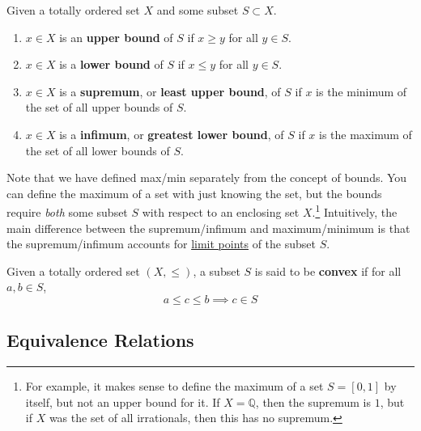   \begin{definition}[Bounds]
    \label{def:bounds}
    Given a totally ordered set $X$ and some subset $S \subset X$. 
    \begin{enumerate}
      \item $x \in X$ is an \textbf{upper bound} of $S$ if $x \geq y$ for all $y \in S$. 
      \item $x \in X$ is a \textbf{lower bound} of $S$ if $x \leq y$ for all $y \in S$. 
      \item $x \in X$ is a \textbf{supremum}, or \textbf{least upper bound}, of $S$ if $x$ is the minimum of the set of all upper bounds of $S$. 
      \item $x \in X$ is a \textbf{infimum}, or \textbf{greatest lower bound}, of $S$ if $x$ is the maximum of the set of all lower bounds of $S$. 
    \end{enumerate}
  \end{definition}

  Note that we have defined max/min separately from the concept of bounds. You can define the maximum of a set with just knowing the set, but the bounds require \textit{both} some subset $S$ with respect to an enclosing set $X$.\footnote{For example, it makes sense to define the maximum of a set $S = [0, 1]$ by itself, but not an upper bound for it. If $X = \mathbb{Q}$, then the supremum is $1$, but if $X$ was the set of all irrationals, then this has no supremum.} Intuitively, the main difference between the supremum/infimum and maximum/minimum is that the supremum/infimum accounts for \hyperref[pst-def:limit-point]{limit points} of the subset $S$. 

  \begin{definition}
    \label{def:convexity-on-ordered-sets}
    Given a totally ordered set $(X, \leq)$, a subset $S$ is said to be \textbf{convex} if for all $a, b \in S$, 
    \begin{equation}
      a \leq c \leq b \implies c \in S
    \end{equation}
  \end{definition}

\subsection{Equivalence Relations}

